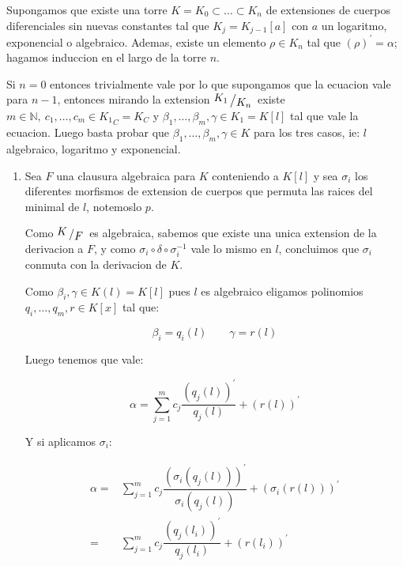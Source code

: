 \documentclass[11pt]{article}
\newcommand{\N}{{\mathbb{N}}}
\newcommand{\quotient}[2]{{\raisebox{.2em}{$#1$}\left/\raisebox{-.2em}{$#2$}\right.}}
\newcommand{\derivation}[1]{\left(#1\right)^\prime}
\newcommand{\constants}[1]{#1_C}
\numberwithin{theorem}{subsection}
\newenvironment{proof}[1][Demostraci\'on]{\begin{trivlist}
		\item[\hskip \labelsep {\bfseries #1}]}{\end{trivlist}}
\begin{document}
\begin{proof}
	Supongamos que existe una torre $K = K_0 \subset \dots \subset K_n$ de extensiones de cuerpos diferenciales sin nuevas constantes tal que $K_j = K_{j-1}[a]$ con $a$ un logaritmo, exponencial o algebraico. Ademas, existe un elemento $\rho \in K_n$ tal que $\derivation{\rho} = \alpha$; hagamos induccion en el largo de la torre $n$.
	
	Si $n=0$ entonces trivialmente vale por lo que supongamos que la ecuacion vale para $n-1$, entonces mirando la extension $\quotient{K_1}{K_n}$ existe $m \in \N, \ c_1, \dots, c_m \in {K_1}_C = \constants{K}$ y $\beta_1, \dots, \beta_m , \gamma \in K_1 = K[l]$ tal que vale la ecuacion. Luego basta probar que $\beta_1, \dots, \beta_m , \gamma \in K$ para los tres casos, ie: $l$ algebraico, logaritmo y exponencial.
	
	\begin{enumerate}
		\item [$l$ algebraico] Sea $F$ una clausura algebraica para $K$ conteniendo a $K[l]$ y sea $\sigma_i$ los diferentes morfismos de extension de cuerpos que permuta las raices del minimal de $l$, notemoslo $p$.
		
		Como $\quotient{K}{F}$ es algebraica, sabemos que existe una unica extension de la derivacion a $F$, y como $\sigma_i \circ \delta \circ \sigma_i^{-1}$ vale lo mismo en $l$, concluimos que $\sigma_i$ conmuta con la derivacion de $K$.
		
		Como $\beta_i, \gamma \in K(l) = K[l]$ pues $l$ es algebraico eligamos polinomios $q_i, \dots, q_m, r \in K[x]$ tal que:
		
		\begin{equation}
			\beta_i = q_i(l) \qquad \gamma = r(l)
		\end{equation}
		
		Luego tenemos que vale:
		
			\begin{equation}
		\alpha = \sum\limits_{j=1}^{m} c_j \dfrac{\derivation{q_j(l)}}{q_j(l)} + \derivation{r(l)}
		\end{equation}
		
		Y si aplicamos $\sigma_i$:
		
		\begin{equation}
		\begin{aligned}
			\alpha = & \sum\limits_{j=1}^{m} c_j \dfrac{\derivation{\sigma_i(q_j(l))}}{\sigma_i(q_j(l))} + \derivation{\sigma_i(r(l))} \\
			= & \sum\limits_{j=1}^{m} c_j \dfrac{\derivation{q_j(l_i)}}{q_j(l_i)} + \derivation{r(l_i)} 
		\end{aligned}
		\end{equation}
		

\end{enumerate}
\end{proof}
\end{document}
